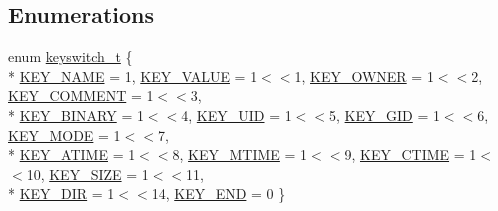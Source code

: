 \subsection*{Enumerations}
\begin{DoxyCompactItemize}
\item 
enum \hyperlink{group__key_ga91fb3178848bd682000958089abbaf40}{keyswitch\-\_\-t} \{ \\*
\hyperlink{group__key_gga91fb3178848bd682000958089abbaf40ad6127fc38f96410bf7c8f6e93b0397da}{K\-E\-Y\-\_\-\-N\-A\-M\-E} = 1, 
\hyperlink{group__key_gga91fb3178848bd682000958089abbaf40ac66e4a49d09212b79f5754ca6db5bd2e}{K\-E\-Y\-\_\-\-V\-A\-L\-U\-E} = 1$<$$<$1, 
\hyperlink{group__key_gga91fb3178848bd682000958089abbaf40a77ca60362fa8daca8d5347db4385068b}{K\-E\-Y\-\_\-\-O\-W\-N\-E\-R} = 1$<$$<$2, 
\hyperlink{group__key_gga91fb3178848bd682000958089abbaf40ac29427bb47cc31689d02912e36161ee3}{K\-E\-Y\-\_\-\-C\-O\-M\-M\-E\-N\-T} = 1$<$$<$3, 
\\*
\hyperlink{group__key_gga91fb3178848bd682000958089abbaf40a1ca18d4e094ae7487d35ecedda2235ff}{K\-E\-Y\-\_\-\-B\-I\-N\-A\-R\-Y} = 1$<$$<$4, 
\hyperlink{group__key_gga91fb3178848bd682000958089abbaf40a28f01a87d65f065172f734c9c9446c0e}{K\-E\-Y\-\_\-\-U\-I\-D} = 1$<$$<$5, 
\hyperlink{group__key_gga91fb3178848bd682000958089abbaf40ac0628bbaba7c837ca73323681393d15f}{K\-E\-Y\-\_\-\-G\-I\-D} = 1$<$$<$6, 
\hyperlink{group__key_gga91fb3178848bd682000958089abbaf40a1b0a91ff3a855d6993930ebf0abaa518}{K\-E\-Y\-\_\-\-M\-O\-D\-E} = 1$<$$<$7, 
\\*
\hyperlink{group__key_gga91fb3178848bd682000958089abbaf40af303f9ebb4983d7500ba8e06ef3ec178}{K\-E\-Y\-\_\-\-A\-T\-I\-M\-E} = 1$<$$<$8, 
\hyperlink{group__key_gga91fb3178848bd682000958089abbaf40abfbab4bf55be6c53a7ffb2e43a82b355}{K\-E\-Y\-\_\-\-M\-T\-I\-M\-E} = 1$<$$<$9, 
\hyperlink{group__key_gga91fb3178848bd682000958089abbaf40afbad53ecfc1512b1b49ca04b57a628b4}{K\-E\-Y\-\_\-\-C\-T\-I\-M\-E} = 1$<$$<$10, 
\hyperlink{group__key_gga91fb3178848bd682000958089abbaf40a6d531b5c41445d19d0452eebdccbfa01}{K\-E\-Y\-\_\-\-S\-I\-Z\-E} = 1$<$$<$11, 
\\*
\hyperlink{group__key_gga91fb3178848bd682000958089abbaf40a9e43e47c8a21478538e2d20e049981d5}{K\-E\-Y\-\_\-\-D\-I\-R} = 1$<$$<$14, 
\hyperlink{group__key_gga91fb3178848bd682000958089abbaf40aa8adb6fcb92dec58fb19410eacfdd403}{K\-E\-Y\-\_\-\-E\-N\-D} = 0
 \}
\end{DoxyCompactItemize}
